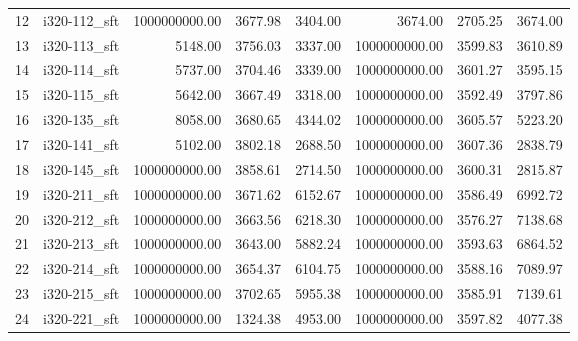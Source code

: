 \begin{tabular}{llrrrrrr}
12 &  i320-112\_sft &         1000000000.00 &                   3677.98 &             3404.00 &            3674.00 &                2705.25 &          3674.00 \\
13 &  i320-113\_sft &               5148.00 &                   3756.03 &             3337.00 &      1000000000.00 &                3599.83 &          3610.89 \\
14 &  i320-114\_sft &               5737.00 &                   3704.46 &             3339.00 &      1000000000.00 &                3601.27 &          3595.15 \\
15 &  i320-115\_sft &               5642.00 &                   3667.49 &             3318.00 &      1000000000.00 &                3592.49 &          3797.86 \\
16 &  i320-135\_sft &               8058.00 &                   3680.65 &             4344.02 &      1000000000.00 &                3605.57 &          5223.20 \\
17 &  i320-141\_sft &               5102.00 &                   3802.18 &             2688.50 &      1000000000.00 &                3607.36 &          2838.79 \\
18 &  i320-145\_sft &         1000000000.00 &                   3858.61 &             2714.50 &      1000000000.00 &                3600.31 &          2815.87 \\
19 &  i320-211\_sft &         1000000000.00 &                   3671.62 &             6152.67 &      1000000000.00 &                3586.49 &          6992.72 \\
20 &  i320-212\_sft &         1000000000.00 &                   3663.56 &             6218.30 &      1000000000.00 &                3576.27 &          7138.68 \\
21 &  i320-213\_sft &         1000000000.00 &                   3643.00 &             5882.24 &      1000000000.00 &                3593.63 &          6864.52 \\
22 &  i320-214\_sft &         1000000000.00 &                   3654.37 &             6104.75 &      1000000000.00 &                3588.16 &          7089.97 \\
23 &  i320-215\_sft &         1000000000.00 &                   3702.65 &             5955.38 &      1000000000.00 &                3585.91 &          7139.61 \\
24 &  i320-221\_sft &         1000000000.00 &                   1324.38 &             4953.00 &      1000000000.00 &                3597.82 &          4077.38 \\

\end{tabular}
